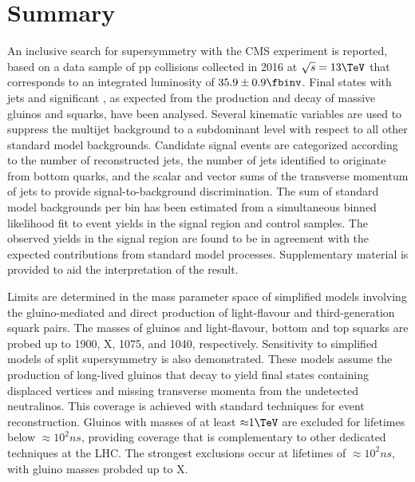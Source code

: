 \clearpage
\section{Summary}
\label{sec:summary}

An inclusive search for supersymmetry with the CMS experiment is
reported, based on a data sample of pp collisions collected in 2016 at
$\sqrt{s} = 13\TeV$ that corresponds to an integrated luminosity of
$35.9 \pm 0.9 \fbinv$. Final states with jets and significant
\ptvecmiss, as expected from the production and decay of massive
gluinos and squarks, have been analysed. Several kinematic variables
are used to suppress the multijet background to a subdominant level
with respect to all other standard model backgrounds. Candidate signal
events are categorized according to the number of reconstructed jets,
the number of jets identified to originate from bottom quarks, and the
scalar and vector sums of the transverse momentum of jets to provide
signal-to-background discrimination. The sum of standard model
backgrounds per bin has been estimated from a simultaneous binned
likelihood fit to event yields in the signal region and control
samples. The observed yields in the signal region are found to be in
agreement with the expected contributions from standard model
processes. Supplementary material is provided to aid the
interpretation of the result.

Limits are determined in the mass parameter space of simplified models
involving the gluino-mediated and direct production of light-flavour
and third-generation squark pairs. The masses of gluinos and
light-flavour, bottom and top squarks are probed up to 1900, X, 1075,
and 1040\GeV, respectively. Sensitivity to simplified models of split
supersymmetry is also demonstrated. These models assume the production
of long-lived gluinos that decay to yield final states containing
displaced vertices and missing transverse momenta from the undetected
neutralinos. This coverage is achieved with standard techniques for
event reconstruction. Gluinos with masses of at least ${\approx}1\TeV$
are excluded for lifetimes below ${\approx}10^{2}\unit{ns}$, providing
coverage that is complementary to other dedicated techniques at the
LHC. The strongest exclusions occur at lifetimes of
${\approx}10^{2}\unit{ns}$, with gluino masses probded up to X\TeV.


